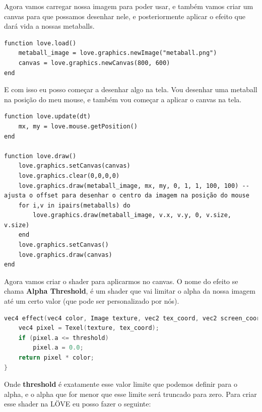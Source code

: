 \documentclass[a4paper,oneside,12pt]{article}
\begin{document}
Agora vamos carregar nossa imagem para poder usar, e também vamos criar um canvas para que possamos desenhar nele, e posteriormente aplicar o efeito que dará vida a nossas metaballs.

\begin{lstlisting}[language={[5.2]Lua}]
function love.load()
    metaball_image = love.graphics.newImage("metaball.png")
    canvas = love.graphics.newCanvas(800, 600)
end
\end{lstlisting}

E com isso eu posso começar a desenhar algo na tela. Vou desenhar uma metaball na posição do meu mouse, e também vou começar a aplicar o canvas na tela.

\begin{lstlisting}[language={[5.2]Lua}]
function love.update(dt)
    mx, my = love.mouse.getPosition()
end

function love.draw()
    love.graphics.setCanvas(canvas)
    love.graphics.clear(0,0,0,0)
    love.graphics.draw(metaball_image, mx, my, 0, 1, 1, 100, 100) -- ajusta o offset para desenhar o centro da imagem na posição do mouse
    for i,v in ipairs(metaballs) do
        love.graphics.draw(metaball_image, v.x, v.y, 0, v.size, v.size)
    end
    love.graphics.setCanvas()
    love.graphics.draw(canvas)
end
\end{lstlisting}

Agora vamos criar o shader para aplicarmos no canvas. O nome do efeito se chama \textbf{Alpha Threshold}, é um shader que vai limitar o alpha da nossa imagem até um certo valor (que pode ser personalizado por nós).

\begin{lstlisting}[language=C]
vec4 effect(vec4 color, Image texture, vec2 tex_coord, vec2 screen_coord) { 
    vec4 pixel = Texel(texture, tex_coord); 
    if (pixel.a <= threshold)
        pixel.a = 0.0;
    return pixel * color;
}
\end{lstlisting}

Onde \textbf{threshold} é exatamente esse valor limite que podemos definir para o alpha, e o alpha que for menor que esse limite será truncado para zero. Para criar esse shader na LÖVE eu posso fazer o seguinte:
\end{document}

